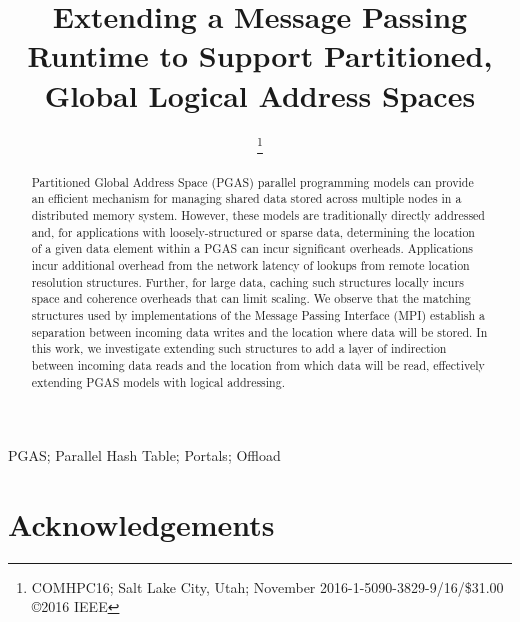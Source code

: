 \documentclass[10pt,conference]{IEEEtran}
\begin{document}
\IEEEoverridecommandlockouts
\title{Extending a Message Passing Runtime to Support Partitioned, Global Logical Address Spaces}
\author{
\and
{}
\thanks{\hspace{-1em}COMHPC16; Salt Lake City, Utah; November 2016-1-5090-3829-9/16/\$31.00 \copyright 2016 IEEE}
}

\maketitle

\begin{abstract}

Partitioned Global Address Space (PGAS) parallel programming models
can provide an efficient mechanism for managing shared data stored
across multiple nodes in a distributed memory system.  However,
these models are traditionally directly addressed and, for
applications with loosely-structured or sparse data, determining the
location of a given data element within a PGAS can incur significant
overheads.  Applications incur additional overhead from the network
latency of lookups from remote location resolution structures.
Further, for large data, caching such structures locally incurs
space and coherence overheads that can limit scaling.
%
We observe that the matching structures used by implementations of the Message
Passing Interface (MPI) establish a separation between incoming data writes and
the location where data will be stored.  In this work, we investigate extending
such structures to add a layer of indirection between incoming data reads
and the location from which data will be read, effectively extending PGAS models
with logical addressing.

\end{abstract}

\begin{IEEEkeywords}
PGAS; Parallel Hash Table; Portals; Offload
\end{IEEEkeywords}







\section*{Acknowledgements}
\end{document}
